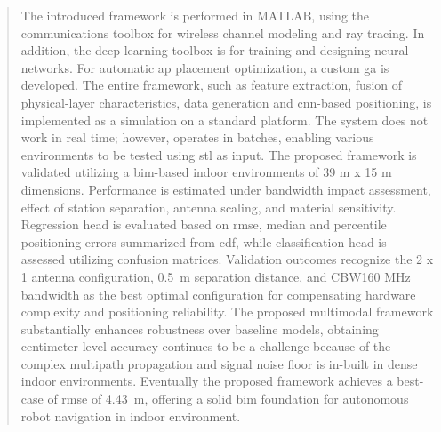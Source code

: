 \documentclass[colorlinks=true,linkcolor=blue]{thesisclass}
\theoremstyle{plain}
\begin{document}
\begin{abstract}
The introduced framework is performed in MATLAB, using the communications toolbox for wireless channel modeling and ray tracing. In addition, the deep learning toolbox is for training and designing neural networks. For automatic \acrshort{ap} placement optimization, a custom \acrshort{ga} is developed. The entire framework, such as feature extraction, fusion of physical-layer characteristics, data generation and \acrshort{cnn}-based positioning, is implemented as a simulation on a standard platform. The system does not work in real time; however, operates in batches, enabling various environments to be tested using \gls{stl} as input.
The proposed framework is validated utilizing a \acrshort{bim}-based indoor environments of 39 m x 15 m dimensions. Performance is estimated under bandwidth impact assessment, effect of station separation, antenna scaling, and material sensitivity. Regression head is evaluated based on \acrshort{rmse}, median and percentile positioning errors summarized from \acrshort{cdf}, while classification head is assessed utilizing confusion matrices.
Validation outcomes recognize the 2 x 1 antenna configuration, 0.5~m separation distance, and CBW160 MHz bandwidth as the best optimal configuration for compensating hardware complexity and positioning reliability. The proposed multimodal framework substantially enhances robustness over baseline models, obtaining centimeter-level accuracy continues to be a challenge because of the complex multipath propagation and signal noise floor is in-built in dense indoor environments. Eventually the proposed framework achieves a best-case of \acrshort{rmse} of 4.43~m, offering a solid \acrshort{bim} foundation for autonomous robot navigation in indoor environment.
\end{abstract}
\pagebreak

\printdeclaration

\printtaskdescription \newpage 


\tableofcontents\newpage
\listoffigures\newpage
\listoftables
\printglossaries\newpage

\clearpage
{}
\setcounter{page}{1}
\pagestyle{plain}

\end{document}
